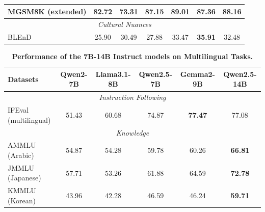\documentclass{article}
\begin{document}
\begin{table}[t]
\begin{tabular}{@{}lcccccc@{}}
\midrule

MGSM8K (extended) & 82.72 & 73.31 & 87.15 & \textbf{89.01} & 87.36 & 88.16 \\

\midrule

\multicolumn{7}{c}{\textit{Cultural Nuances}} \\

\midrule

BLEnD & 25.90 & 30.49 & 27.88 & 33.47 & \textbf{35.91} & 32.48 \\

\bottomrule

\end{tabular}

\end{table}

\begin{table}[t]

\centering

\caption{\textbf{Performance of the 7B-14B Instruct models on Multilingual Tasks.}}

\label{tab:eval_multilingual_14B}
\small
\setlength{\tabcolsep}{2.6pt}

\begin{tabular}{@{}lccccc@{}}

\toprule

\textbf{Datasets} & \textbf{Qwen2-7B} & \textbf{Llama3.1-8B} & \textbf{Qwen2.5-7B} & \textbf{Gemma2-9B} & \textbf{Qwen2.5-14B} \\

\midrule

\multicolumn{6}{c}{\textit{Instruction Following}} \\

\midrule

IFEval (multilingual) & 51.43 & 60.68 & 74.87 & \textbf{77.47} & 77.08 \\

\midrule

\multicolumn{6}{c}{\textit{Knowledge}} \\

\midrule

AMMLU (Arabic) & 54.87 & 54.28 & 59.78 & 60.26 & \textbf{66.81} \\

JMMLU (Japanese) & 57.71 & 53.26 & 61.88 & 64.59 & \textbf{72.78} \\

KMMLU (Korean) & 43.96 & 42.28 & 46.59 & 46.24 & \textbf{59.71} \\


\end{tabular}
\end{table}
\end{document}
